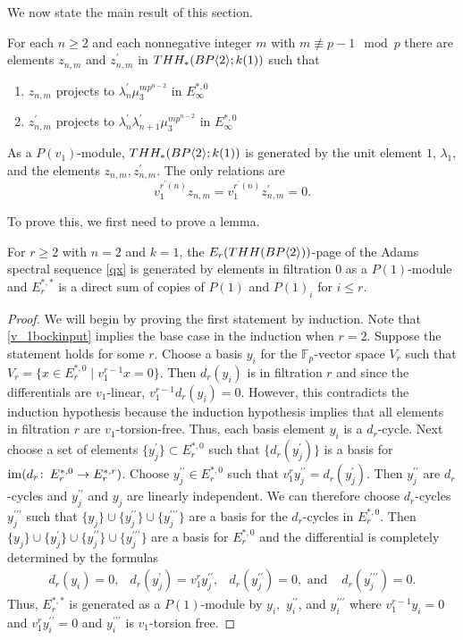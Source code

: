 We now state the main result of this section. 
\begin{thm}\label{mod p v_2}
For each $n \ge 2$ and each nonnegative integer $m$ with $m \not\equiv p - 1 \mod{p}$ there are elements $z_{n,m}$ and $z^{\prime}_{n,m}$ in $THH_*(BP\langle 2 \rangle;k(1))$ such that
\begin{enumerate} 
\item $z_{n,m}$ projects to $\lambda^{\prime}_n\mu_3^{mp^{n-2}}$ in $E_{\infty}^{*,0}$
\item $z_{n,m}^{\prime}$ projects to $\lambda^{\prime}_n\lambda^{\prime}_{n+1}\mu_3^{mp^{n-2}}$ in $E_{\infty}^{*,0}$
\end{enumerate}
 As a $P(v_1)$-module, $THH_*(BP\langle 2 \rangle;k(1))$ is generated by the unit element
$1$, $\lambda_1$, and the elements $z_{n,m},z_{n,m}^{\prime}$. The only relations are
\[v_1^{r^{\prime}(n)}z_{n,m}=v_1^{r^{\prime}(n)}z_{n,m}^{\prime}=0.\]
\end{thm}
To prove this, we first need to prove a lemma. 
\begin{lem} \label{lem mod p v_2}
For $r\ge 2$ with $n=2$ and $k=1$, the $E_r(THH(BP\langle 2 \rangle))$-page of the Adams spectral sequence \eqref{qx} is generated by elements in filtration $0$ as a $P(1)$-module and $E_{r}^{*,*}$ is a direct sum of copies of $P(1)$ and $P(1)_i$ for $i\le r$. 
\end{lem}
\begin{proof}
We will begin by proving the first statement by induction. Note that \eqref{v_1bockinput} implies the base case in the induction when $r=2$. Suppose the statement holds for some $r$. Choose a basis $y_i$ for the $\mathbb{F}_p$-vector space $V_r$ such that $V_r=\{ x \in E_r^{*,0}\mid v_1^{r-1}x=0\}$. Then $d_r(y_i)$ is in filtration $r$ and since the differentials are $v_1$-linear, $v_1^{r-1}d_r(y_i)=0$. However, this contradicts the induction hypothesis because the induction hypothesis implies that all elements in filtration $r$ are $v_1$-torsion-free. Thus, each basis element $y_i$ is a $d_r$-cycle. Next choose a set of elements $\{y^{\prime}_j\}\subset E_r^{*,0}$ such that $\{d_r(y_j^{\prime})\}$ is a basis for $\operatorname{im}(d_r\colon \thinspace E_r^{*,0}\to E_r^{*,r})$. Choose $y^{\prime\prime}_j\in E_r^{*,0}$ such that $v_1^{r}y^{\prime\prime}_j=d_r(y_j^{\prime})$. Then $y^{\prime\prime}_j$ are $d_r$-cycles and $y^{\prime \prime}_j$ and $y_j$ are linearly independent. We can therefore choose $d_r$-cycles $y^{\prime \prime\prime}_j$ such that $\{y_j\}\cup\{y_j^{\prime\prime}\}\cup\{y_j^{\prime\prime\prime}\}$ are a basis for the $d_r$-cycles in $E_{r}^{*,0}$. Then 
$\{y_j\}\cup\{y_j^{\prime}\}\cup \{y_j^{\prime\prime}\}\cup\{y_j^{\prime\prime\prime}\}$
are a basis for $E_r^{*,0}$ and the differential is completely determined by the formulas
\[ \begin{array}{cccc} d_r(y_i)=0 , &d_r(y_j^{\prime})=v_1^{r}y_j^{\prime \prime}, & d_r(y_j^{\prime \prime})=0, \text{ and } & d_r(y_j^{\prime \prime \prime})=0. \end{array}\]
Thus, $E_r^{*,*}$ is generated as a $P(1)$-module by $y_i,$ $y_i^{\prime \prime}$, and $y_i^{\prime \prime\prime}$ where $v_1^{r-1}y_i=0$ and $v_1^ry_i^{\prime \prime}=0$ and $y_i^{\prime \prime \prime}$ is $v_1$-torsion free. 
\end{proof}
